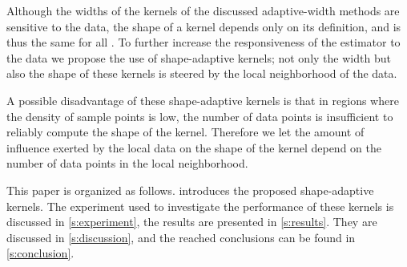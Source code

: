 	Although the widths of the kernels of the discussed adaptive-width methods are sensitive to the data, the shape of a kernel depends only on its definition, and is thus the same for all \varPattern{\itXis}. To further increase the responsiveness of the estimator to the data we propose the use of shape-adaptive kernels; not only the width but also the shape of these kernels is steered by the local neighborhood of the data.

	A possible disadvantage of these shape-adaptive kernels is that in regions where the density of sample points is low, the number of data points is insufficient to reliably compute the shape of the kernel. Therefore we let the amount of influence exerted by the local data on the shape of the kernel depend on the number of data points in the local neighborhood.

	This paper is organized as follows.  introduces the proposed shape-adaptive kernels. The experiment used to investigate the performance of these kernels is discussed in \cref{s:experiment}, the results are presented in \cref{s:results}. They are discussed in \cref{s:discussion}, and the reached conclusions can be found in \cref{s:conclusion}.